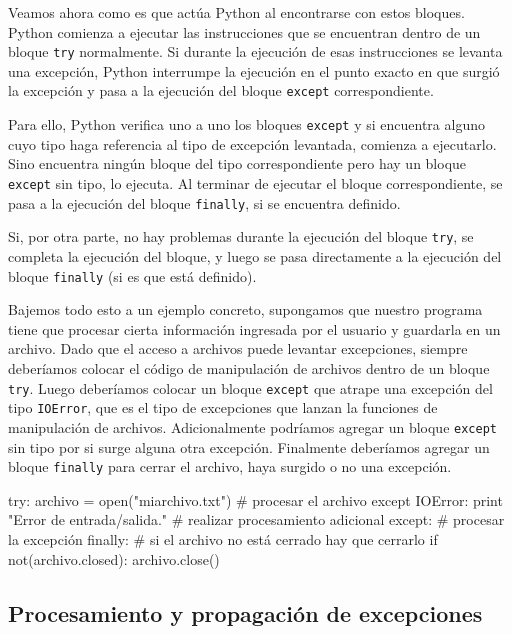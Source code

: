 Veamos ahora como es que actúa Python al encontrarse con estos bloques. Python
comienza a ejecutar las instrucciones que se encuentran dentro de un bloque
\lstinline!try! normalmente. Si durante la ejecución de esas instrucciones
se levanta una excepción, Python interrumpe la ejecución en el
punto exacto en que surgió la excepción y pasa a la ejecución del bloque
\lstinline!except! correspondiente.

Para ello, Python verifica uno a uno los bloques \lstinline!except! y si
encuentra alguno cuyo tipo haga referencia al tipo de excepción levantada,
comienza a ejecutarlo. Sino encuentra ningún bloque del tipo
correspondiente pero hay un bloque \lstinline!except! sin tipo, lo
ejecuta. Al terminar de ejecutar el bloque correspondiente, se pasa a la
ejecución del bloque \lstinline!finally!, si se encuentra definido.

Si, por otra parte, no hay problemas durante la ejecución del bloque
\lstinline!try!, se completa la ejecución del bloque, y luego se pasa
directamente a la ejecución del bloque \lstinline!finally! (si es que está
definido).

Bajemos todo esto a un ejemplo concreto, supongamos que nuestro programa
tiene que procesar cierta información ingresada por el usuario y guardarla
en un archivo. Dado que el acceso a archivos puede levantar
excepciones, siempre deberíamos colocar el código de manipulación de
archivos dentro de un bloque \lstinline!try!. Luego deberíamos
colocar un bloque \lstinline!except! que atrape una excepción del tipo
\lstinline!IOError!, que es el tipo de excepciones que lanzan la funciones
de manipulación de archivos. Adicionalmente podríamos agregar un bloque
\lstinline!except! sin tipo por si surge alguna otra excepción.  Finalmente
deberíamos agregar un bloque \lstinline!finally! para cerrar el archivo,
haya surgido o no una excepción.

\begin{codigo-python-sn}
try:
	archivo = open("miarchivo.txt")
	# procesar el archivo
except IOError:
	print "Error de entrada/salida."
	# realizar procesamiento adicional
except:
	# procesar la excepción
finally:
	# si el archivo no está cerrado hay que cerrarlo
	if not(archivo.closed):
		archivo.close()
\end{codigo-python-sn}

\subsection{Procesamiento y propagación de excepciones}

